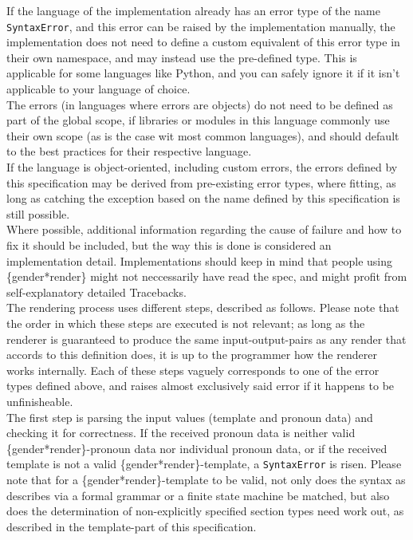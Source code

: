 \documentclass{article}
\begin{document}
    If the language of the implementation already has an error type of the name \texttt{SyntaxError}, and this error can be raised by the implementation manually, the implementation does not need to define a custom equivalent of this error type in their own namespace, and may instead use the pre-defined type.
    This is applicable for some languages like Python, and you can safely ignore it if it isn't applicable to your language of choice.\\
    The errors (in languages where errors are objects) do not need to be defined as part of the global scope, if libraries or modules in this language commonly use their own scope (as is the case wit most common languages), and should default to the best practices for their respective language.\\
    If the language is object-oriented, including custom errors, the errors defined by this specification may be derived from pre-existing error types, where fitting, as long as catching the exception based on the name defined by this specification is still possible.\\
    Where possible, additional information regarding the cause of failure and how to fix it should be included, but the way this is done is considered an implementation detail.
    Implementations should keep in mind that people using \{gender*render\} might not neccessarily have read the spec, and might profit from self-explanatory detailed Tracebacks.\\

    The rendering process uses different steps, described as follows.
    Please note that the order in which these steps are executed is not relevant;
    as long as the renderer is guaranteed to produce the same input-output-pairs as any render that accords to this definition does, it is up to the programmer how the renderer works internally.
    Each of these steps vaguely corresponds to one of the error types defined above, and raises almost exclusively said error if it happens to be unfinisheable.\\

    The first step is parsing the input values (template and pronoun data) and checking it for correctness.
    If the received pronoun data is neither valid \{gender*render\}-pronoun data nor individual pronoun data, or if the received template is not a valid \{gender*render\}-template, a \texttt{SyntaxError} is risen.
    Please note that for a \{gender*render\}-template to be valid, not only does the syntax as describes via a formal grammar or a finite state machine be matched, but also does the determination of non-explicitly specified section types need work out, as described in the template-part of this specification.\\
\end{document}
